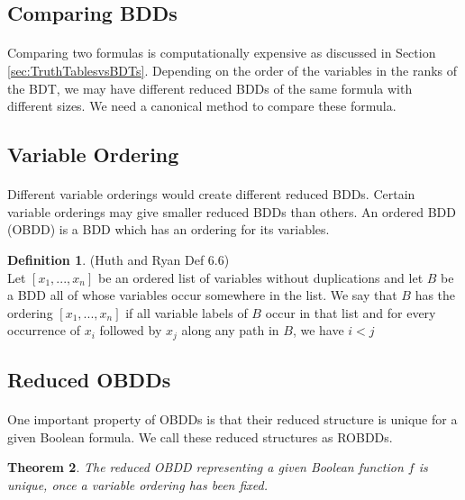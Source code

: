 \documentclass{article}
\theoremstyle{plain}
\newtheorem{thm}{Theorem}[section]
\theoremstyle{definition}
\newtheorem{defn}[thm]{Definition} %
\begin{document}
\begin{multicols}{2}
\subsection{Comparing BDDs}

\paragraph{} Comparing two formulas is computationally expensive as discussed in Section \ref{sec:TruthTablesvsBDTs}. Depending on the order of the variables in the ranks of the BDT, we may have different reduced BDDs of the same formula with different sizes. We need a canonical method to compare these formula.

\subsection{Variable Ordering}

\paragraph{} Different variable orderings would create different reduced BDDs. Certain variable orderings may give smaller reduced BDDs than others. An ordered BDD (OBDD) is a BDD which has an ordering for its variables.

\begin{defn}
(Huth and Ryan Def 6.6)\\
Let $[x_1,...,x_n]$ be an ordered list of variables without duplications and let $B$ be a BDD all of whose variables occur somewhere in the list. We say that $B$ has the ordering $[x_1, ..., x_n]$ if all variable labels of $B$ occur in that list and for every occurrence of $x_i$ followed by $x_j$ along any path in $B$, we have $i < j$
\end{defn}

\subsection{Reduced OBDDs}

\paragraph{} One important property of OBDDs is that their reduced structure is unique for a given Boolean formula. We call these reduced structures as ROBDDs.

\begin{thm}
The reduced OBDD representing a given Boolean function $f$ is unique, once a variable ordering has been fixed.
\end{thm}


\end{multicols}
\end{document}
